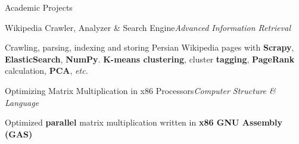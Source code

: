 
\vspace{0.2cm}

\begin{xSection}{Academic Projects}

    \vspace{0.3cm}


    \begin{tSubsection}{Wikipedia Crawler, Analyzer \& Search Engine}{\textit{{\scriptsize Advanced Information Retrieval}}}{}{}
    \item {\small Crawling, parsing, indexing and storing Persian Wikipedia pages with \textbf{Scrapy}, \textbf{ElasticSearch}, \textbf{NumPy}. \textbf{K-means clustering}, cluster \textbf{tagging}, \textbf{PageRank} calculation, \textbf{PCA}, \textit{etc.}}
    \end{tSubsection}

    \begin{tSubsection}{Optimizing Matrix Multiplication in x86 Processors}{\textit{{\scriptsize Computer Structure \& Language}}}{}{}
    \item {\small Optimized \textbf{parallel} matrix multiplication written in \textbf{x86 GNU Assembly (GAS)}}
    \end{tSubsection}

    \vspace{-.1cm}


%
%



\end{xSection}
